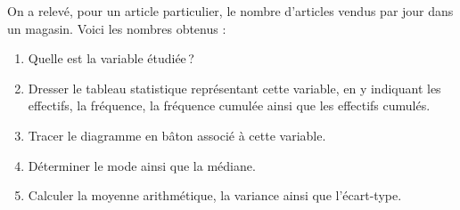       \begin{exo}
            \label{exo:stat3}
	            On a relevé, pour un article particulier, le nombre d’articles vendus par jour dans un magasin.
	            Voici les nombres obtenus :
	            \begin{center}
	            \end{center}
            \begin{enumerate}
	                  \item Quelle est la variable \'etudi\'ee\,?
                  \item Dresser le tableau statistique repr\'esentant cette variable,
	                        en y indiquant les effectifs, la fr\'equence, la fr\'equence cumul\'ee ainsi que les effectifs cumul\'es.
                  \item Tracer le diagramme en b\^aton associ\'e \`a cette variable.
                  \item D\'eterminer le mode ainsi que la m\'ediane.
                  \item Calculer la moyenne arithm\'etique, la variance ainsi que l'\'ecart-type.
            \end{enumerate}
      \end{exo}
